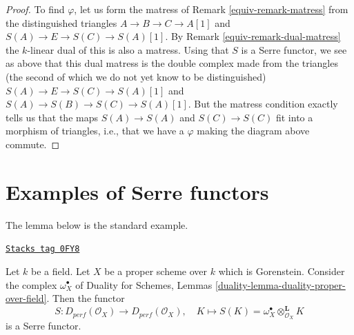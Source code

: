 \begin{proof}
\medskip\noindent
To find $\varphi$, let us form the matress of Remark \ref{equiv-remark-matress}
from the distinguished triangles
$A \to B \to C \to A[1]$ and $S(A) \to E \to S(C) \to S(A)[1]$.
By Remark \ref{equiv-remark-dual-matress} the $k$-linear dual
of this is also a matress. Using that $S$ is a Serre functor, we
see as above that this dual matress is the double complex made from
the triangles (the second of which we do not yet know to be distinguished)
$S(A) \to E \to S(C) \to S(A)[1]$ and $S(A) \to S(B) \to S(C) \to S(A)[1]$.
But the matress condition exactly tells us that the maps
$S(A) \to S(A)$ and $S(C) \to S(C)$ fit into a morphism of triangles,
i.e., that we have a $\varphi$ making the diagram above commute.
\end{proof}

\section{Examples of Serre functors}
\label{equiv-section-examples-Serre-functors}
The lemma below is the standard example.

\begin{lemma}
\label{equiv-lemma-Serre-functor-Gorenstein-proper}
\href{https://stacks.math.columbia.edu/tag/0FY8}{\texttt{Stacks tag 0FY8}}

Let $k$ be a field. Let $X$ be a proper scheme over $k$ which is Gorenstein.
Consider the complex $\omega_X^\bullet$ of
Duality for Schemes, Lemmas \ref{duality-lemma-duality-proper-over-field}.
Then the functor
$$
S : D_{perf}(\mathcal{O}_X) \longrightarrow D_{perf}(\mathcal{O}_X),\quad
K \longmapsto S(K) = \omega_X^\bullet \otimes_{\mathcal{O}_X}^\mathbf{L} K
$$
is a Serre functor.
\end{lemma}

